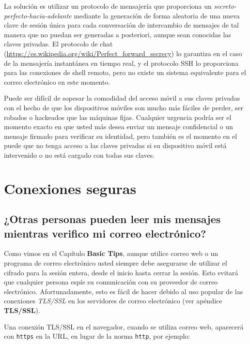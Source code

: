 \documentclass[10pt,a5paper,twoside,,]{book}
\begin{document}
La solución es utilizar un protocolo de mensajería que proporciona un
\emph{secreto-perfecto-hacia-adelante} mediante la generación de forma
aleatoria de una nueva clave de sesión única para cada conversación de
intercambio de mensajes de tal manera que no puedan ser generadas a
posteriori, aunque sean conocidas las claves privadas. El protocolo de
chat (\url{https://es.wikipedia.org/wiki/Perfect_forward_secrecy}) lo
garantiza en el caso de la mensajería instantánea en tiempo real, y el
protocolo SSH lo proporciona para las conexiones de shell remoto, pero
no existe un sistema equivalente para el correo electrónico en este
momento.

Puede ser difícil de sopesar la comodidad del acceso móvil a sus claves
privadas con el hecho de que los dispositivos móviles son mucho más
fáciles de perder, ser robados o hackeados que las máquinas fijas.
Cualquier urgencia podría ser el momento exacto en que usted más desea
enviar un mensaje confidencial o un mensaje firmado para verificar su
identidad, pero también es el momento en el puede que no tenga acceso a
las claves privadas si su dispositivo móvil está intervenido o no está
cargado con todas sus claves.

\chapter{Conexiones seguras}\label{conexiones-seguras}

\section{¿Otras personas pueden leer mis mensajes mientras verifico mi
correo
electrónico?}\label{otras-personas-pueden-leer-mis-mensajes-mientras-verifico-mi-correo-electruxf3nico}

Como vimos en el Capítulo \textbf{Basic Tips}, aunque utilice correo web
o un programa de correo electrónico usted siempre debe asegurarse de
utilizar el cifrado para la sesión entera, desde el inicio hasta cerrar
la sesión. Esto evitará que cualquier persona espíe su comunicación con
su proveedor de correo electrónico. Afortunadamente, esto es fácil de
hacer debido al uso popular de las conexiones \emph{TLS/SSL} en los
servidores de correo electrónico (ver apéndice \textbf{TLS/SSL}).

Una conexión TLS/SSL en el navegador, cuando se utiliza correo web,
aparecerá con \texttt{https} en la URL, en lugar de la norma
\texttt{http}, por ejemplo:
\end{document}
